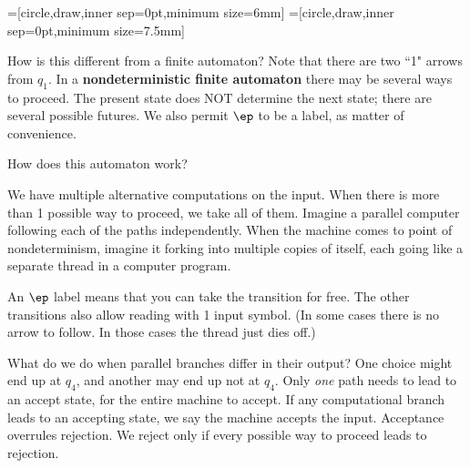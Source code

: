 =[circle,draw,inner sep=0pt,minimum size=6mm]
=[circle,draw,inner sep=0pt,minimum size=7.5mm]
\begin{center}
\end{center}

How is this different from a finite automaton? Note that there are two ``1" arrows from $q_1$. In a \textbf{nondeterministic finite automaton} there may be several ways to proceed. The present state does NOT determine the next state; there are several possible futures. We also permit $\ep$ to be a %
label, as matter of convenience.

How does this automaton work?

We have multiple alternative computations on the input. When there is more than 1 possible way to proceed, we take all of them. %
Imagine a parallel computer following each of the paths independently. When the machine comes to point of nondeterminism, imagine it forking into multiple copies of itself, each going like a separate thread in a computer program.

An $\ep$ label means that you can take the transition for free. The other transitions also allow reading with 1 input symbol. (In some cases there is no arrow to follow. In those cases the thread just dies off.)


What do we do when parallel branches differ in their output? One choice might end up at $q_4$, and another may end up not at $q_4$. Only \emph{one} path needs to lead to an accept state, for the entire machine to accept. %
If any computational branch leads to an accepting state, we say the machine accepts the input. Acceptance overrules rejection.
We reject only if every possible way to proceed leads to rejection.

